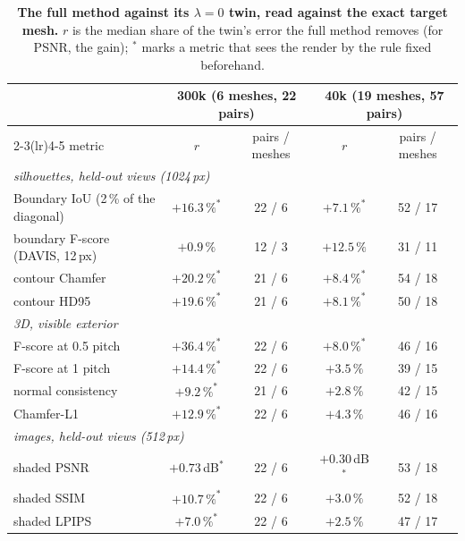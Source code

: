 \begin{table}[t]
\centering
\footnotesize
\setlength{\tabcolsep}{4pt}
\caption[{The full method against its $\lambda=0$ twin, read against the exact target mesh}]{\textbf{The full method against its $\lambda=0$ twin, read against the exact target mesh.} $r$ is the median share
of the twin's error the full method removes (for PSNR, the gain); $^\ast$ marks a metric that sees the render by the rule
fixed beforehand.}
\label{ch4:tab_d157}
\begin{tabular}{lcccc}
\toprule
 & \multicolumn{2}{c}{300k (6 meshes, 22 pairs)} & \multicolumn{2}{c}{40k (19 meshes, 57 pairs)} \\
\cmidrule(lr){2-3}\cmidrule(lr){4-5}
metric & $r$ & pairs / meshes & $r$ & pairs / meshes \\
\midrule
\multicolumn{5}{l}{\textit{silhouettes, held-out views (1024\,px)}}\\
Boundary IoU (2\,\% of the diagonal) & $+16.3\,\%^\ast$ & 22 / 6 & $+7.1\,\%^\ast$ & 52 / 17 \\
boundary F-score (DAVIS, 12\,px)      & $+0.9\,\%$       & 12 / 3 & $+12.5\,\%$      & 31 / 11 \\
contour Chamfer                       & $+20.2\,\%^\ast$ & 21 / 6 & $+8.4\,\%^\ast$  & 54 / 18 \\
contour HD95                          & $+19.6\,\%^\ast$ & 21 / 6 & $+8.1\,\%^\ast$  & 50 / 18 \\
\multicolumn{5}{l}{\textit{3D, visible exterior}}\\
F-score at 0.5 pitch                  & $+36.4\,\%^\ast$ & 22 / 6 & $+8.0\,\%^\ast$  & 46 / 16 \\
F-score at 1 pitch                    & $+14.4\,\%^\ast$ & 22 / 6 & $+3.5\,\%$       & 39 / 15 \\
normal consistency                    & $+9.2\,\%^\ast$  & 21 / 6 & $+2.8\,\%$       & 42 / 15 \\
Chamfer-L1                            & $+12.9\,\%^\ast$ & 22 / 6 & $+4.3\,\%$       & 46 / 16 \\
\multicolumn{5}{l}{\textit{images, held-out views (512\,px)}}\\
shaded PSNR                           & $+0.73$\,dB$^\ast$ & 22 / 6 & $+0.30$\,dB$^\ast$ & 53 / 18 \\
shaded SSIM                           & $+10.7\,\%^\ast$ & 22 / 6 & $+3.0\,\%$       & 52 / 18 \\
shaded LPIPS                          & $+7.0\,\%^\ast$  & 22 / 6 & $+2.5\,\%$       & 47 / 17 \\

\end{tabular}
\end{table}
